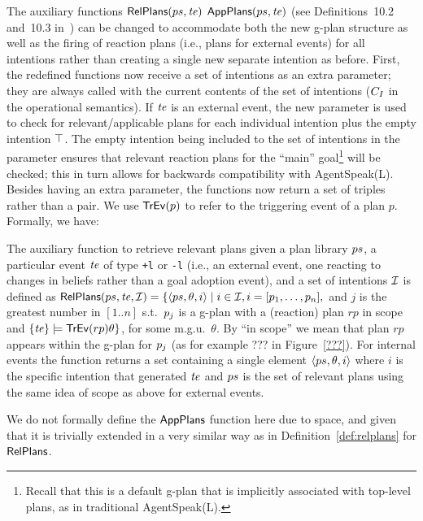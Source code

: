 The auxiliary functions $\mathsf{RelPlans}(ps,\mathit{te})$
$\mathsf{AppPlans}(ps,\mathit{te})$ (see Definitions~10.2 and~10.3
in~\cite{JasonBook}) can be changed to accommodate both the new g-plan
structure as well as the firing of reaction plans (i.e., plans for
external events) for all intentions rather than creating a single new
separate intention as before. First, the redefined functions now
receive a set of intentions as an extra parameter; they are always
called with the current contents of the set of intentions ($C_{I}$ in
the operational semantics). If $\mathit{te}$ is an external event, the new
parameter is used to check for relevant/applicable plans for each
individual intention plus the empty intention $\top$. The empty
intention being included to the set of intentions in the parameter
ensures that relevant reaction plans for the ``main''
goal\footnote{Recall that this is a default g-plan that is implicitly
  associated with top-level plans, as in traditional AgentSpeak(L).}
will be checked; this in turn allows for backwards compatibility with
AgentSpeak(L). Besides having an extra parameter, the functions now
return a set of triples rather than a pair. We use $\mathsf{TrEv}(p)$ to refer
to the triggering event of a plan $p$. Formally, we have:

\begin{definition}
  The auxiliary function to retrieve relevant plans given a plan
  library $ps$, a particular event $\mathit{te}$ of type \texttt{+l} or
  \texttt{-l} (i.e., an external event, one reacting to changes in beliefs
  rather than a goal adoption event), and a set of intentions $\mathcal{I}$
  is defined as
  $\mathsf{RelPlans}(ps,\mathit{te},\mathcal{I}) = \{ \langle ps,\theta,i\rangle
  \mid i \in \mathcal{I}, i = [p_1,\ldots,p_n],$
  and $j$ is the greatest number in $[1..n]$ s.t.\ $p_j$ is a g-plan
  with a (reaction) plan $rp$ in scope and
  $\{\mathit{te}\} \models \mathsf{TrEv}(rp)\theta \}$, for some m.g.u.\ $\theta$. By
  ``in scope'' we mean that plan $rp$ appears within the g-plan for
  $p_j$ (as for example ??? in Figure~\ref{???}). For internal
  events the function returns a set containing a single element
  $\langle ps,\theta,i\rangle$ where $i$ is the specific intention
  that generated $\mathit{te}$ and $ps$ is the set of relevant plans using
  the same idea of scope as above for external events.
\end{definition}

We do not formally define the $\mathsf{AppPlans}$ function here due to space,
and given that it is trivially extended in a very similar way as in
Definition~\ref{def:relplans} for $\mathsf{RelPlans}$.

